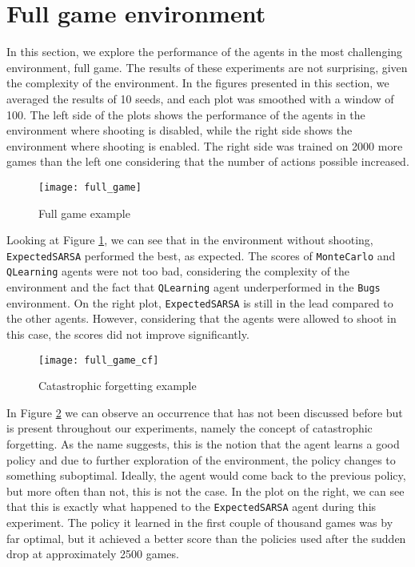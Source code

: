 \section{Full game environment}
In this section, we explore the performance of the agents in the most challenging environment, full game. The results of these experiments are not surprising, given the complexity of the environment. In the figures presented in this section, we averaged the results of 10 seeds, and each plot was smoothed with a window of 100. The left side of the plots shows the performance of the agents in the environment where shooting is disabled, while the right side shows the environment where shooting is enabled. The right side was trained on 2000 more games than the left one considering that the number of actions possible increased.

\begin{figure}[h]
    \centering
    \texttt{[image: full\_game]}
    \caption{Full game example}
    \label{fig:full_game_eg}
\end{figure}

Looking at Figure \ref{fig:full_game_eg}, we can see that in the environment without shooting, \texttt{ExpectedSARSA} performed the best, as expected. The scores of \texttt{MonteCarlo} and \texttt{QLearning} agents were not too bad, considering the complexity of the environment and the fact that \texttt{QLearning} agent underperformed in the \texttt{Bugs} environment. On the right plot, \texttt{ExpectedSARSA} is still in the lead compared to the other agents. However, considering that the agents were allowed to shoot in this case, the scores did not improve significantly.

\begin{figure}[h]
    \centering
    \texttt{[image: full\_game\_cf]}
    \caption{Catastrophic forgetting example}
    \label{fig:full_game_cf_eg}
\end{figure}

In Figure \ref{fig:full_game_cf_eg} we can observe an occurrence that has not been discussed before but is present throughout our experiments, namely the concept of catastrophic forgetting. As the name suggests, this is the notion that the agent learns a good policy and due to further exploration of the environment, the policy changes to something suboptimal. Ideally, the agent would come back to the previous policy, but more often than not, this is not the case. In the plot on the right, we can see that this is exactly what happened to the \texttt{ExpectedSARSA} agent during this experiment. The policy it learned in the first couple of thousand games was by far optimal, but it achieved a better score than the policies used after the sudden drop at approximately 2500 games.

